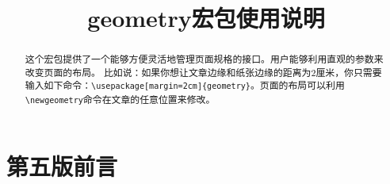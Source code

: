 \documentclass[titlepage]{ctexart}
\begin{document}
\title{\textsf{geometry}宏包使用说明}
\date{}
\maketitle

\tableofcontents
\newpage

\begin{abstract}
	这个宏包提供了一个能够方便灵活地管理页面规格的接口。用户能够利用直观的参数来改变页面的布局。
	比如说：如果你想让文章边缘和纸张边缘的距离为2厘米，你只需要输入如下命令：\verb|\usepackage[margin=2cm]{geometry}|。页面的布局可以利用\verb|\newgeometry|命令在文章的任意位置来修改。
\end{abstract}
\section{第五版前言}
\end{document}
